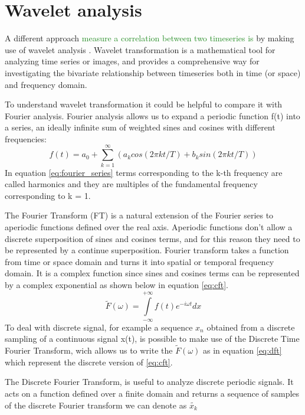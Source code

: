 \documentclass[11pt]{report}
\begin{document}
\section{Wavelet analysis}\label{sec:wavelet_theory}
A different approach \textcolor{ForestGreen}{measure a correlation between two timeseries is} by making use of wavelet analysis \cite{ferrante-2015} \cite{vandenberg-1999}.
Wavelet transformation is a mathematical tool for analyzing time series or images, and provides a comprehensive way for investigating the bivariate relationship between timeseries both in time (or space) and frequency domain.

To understand wavelet transformation it could be helpful to compare it with Fourier analysis.
Fourier analysis allows us to expand a periodic function f(t) into a series, an ideally infinite sum of weighted sines and cosines with different frequencies:
\begin{equation}\label{eq:fourier_series}
f(t) = a_0 + \sum_{k = 1}^\infty (a_k cos(2\pi k t/T) + b_k sin (2\pi k t /T))
\end{equation}
In equation \ref{eq:fourier_series} terms corresponding to the k-th frequency are called harmonics and they are multiples of the fundamental frequency corresponding to k = 1.

The Fourier Transform (FT) is a natural extension of the Fourier series to aperiodic functions defined over the real axis.
Aperiodic functions don't allow a discrete superposition of sines and cosines terms, and for this reason they need to be represented by a continue superposition.
Fourier transform takes a function from time or space domain and turns it into spatial or temporal frequency domain.
It is a complex function since sines and cosines terms can be represented by a complex exponential as shown below in equation \ref{eq:cft}.
\begin{equation}\label{eq:cft}
\tilde{F}(\omega) = \int\limits_{-\infty}^{+\infty} f(t)e^{-i \omega t} dx
\end{equation}
To deal with discrete signal, for example a sequence $x_n$ obtained from a discrete sampling of a continuous signal x(t), is possible to make use of the Discrete Time Fourier Transform, wich allows us to write the $\tilde F(\omega)$ as in equation \ref{eq:dft} which represent the discrete version of \ref{eq:cft}.

The Discrete Fourier Transform, is useful to analyze discrete periodic signals.
It acts on a function defined over a finite domain and returns a sequence of samples of the discrete Fourier transform we can denote as $\tilde{x_k}$
\end{document}
